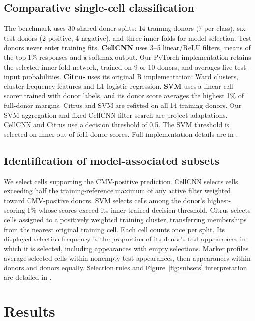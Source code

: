 \documentclass[11pt,a4paper]{article}
\begin{document}
\subsection{Comparative single-cell classification}
The benchmark uses 30 shared donor splits: 14 training donors (7 per class), six test donors (2 positive, 4 negative), and three inner folds for model selection. Test donors never enter training fits. \textbf{CellCNN} uses 3--5 linear/ReLU filters, means of the top 1\% responses and a softmax output. Our PyTorch implementation retains the selected inner-fold network, trained on 9 or 10 donors, and averages five test-input probabilities. \textbf{Citrus} uses its original R implementation: Ward clusters, cluster-frequency features and L1-logistic regression. \textbf{SVM} uses a linear cell scorer trained with donor labels, and its donor score averages the highest 1\% of full-donor margins. Citrus and SVM are refitted on all 14 training donors. Our SVM aggregation and fixed CellCNN filter search are project adaptations. CellCNN and Citrus use a decision threshold of 0.5. The SVM threshold is selected on inner out-of-fold donor scores. Full implementation details are in .

\subsection{Identification of model-associated subsets}
We select cells supporting the CMV-positive prediction. CellCNN selects cells exceeding half the training-reference maximum of any active filter weighted toward CMV-positive donors. SVM selects cells among the donor's highest-scoring 1\% whose scores exceed its inner-trained decision threshold. Citrus selects cells assigned to a positively weighted training cluster, transferring memberships from the nearest original training cell. Each cell counts once per split. Its displayed selection frequency is the proportion of its donor's test appearances in which it is selected, including appearances with empty selections. Marker profiles average selected cells within nonempty test appearances, then appearances within donors and donors equally. Selection rules and Figure~\ref{fig:subsets} interpretation are detailed in .

\section{Results}
\end{document}
